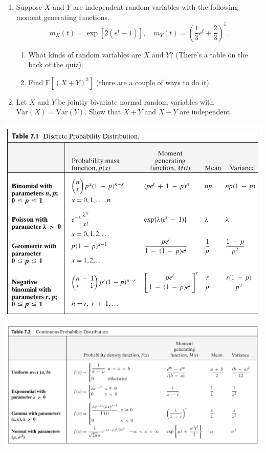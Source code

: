 \documentclass[12pt]{article}
\newcommand{\E}{\mathbb{E}}
\begin{document}
\begin{enumerate}

	\item Suppose $X$ and $Y$ are independent random variables with the following moment generating functions.
	\[
		m_X(t) = \exp[2(e^t-1)],\quad m_Y(t) = \left(\frac{1}{3}e^t + \frac{2}{3}\right)^{5}.
	\]
	\begin{enumerate}
		\item What kinds of random variables are $X$ and $Y$? (There's a table on the back of the quiz).

		\vfill

		\item Find $\E[(X+Y)^2]$ (there are a couple of ways to do it).
	\end{enumerate}

	\vfill

	\item Let $X$ and $Y$ be jointly bivariate normal random variables with $\text{Var}(X) = \text{Var}(Y)$. Show that $X+Y$ and $X-Y$ are independent.

	\vfill\null
\end{enumerate}
\pagebreak

\begin{centering}
	\includegraphics[scale=.5]{table1.PNG}
	\\
	\includegraphics[scale=.5]{table2.PNG}
\end{centering}
\end{document}

